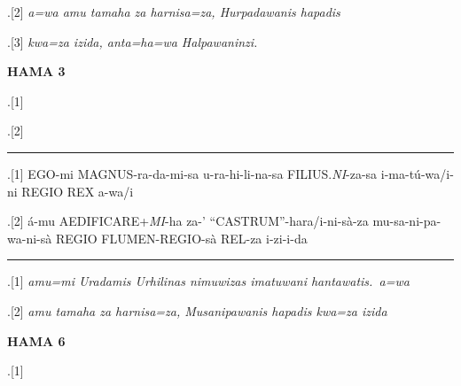 \begin{flushleft}
\ex.[2] \emph{a=wa amu tamaha za harnisa=za, Hurpadawanis hapadis}

\ex.[3] \emph{kwa=za izida, anta=ha=wa Halpawaninzi.}


\noindent \textbf{HAMA 3}

\ex.[1] \large {}\hspace{5pt}
\hspace{5pt}
\hspace{5pt}
\hspace{5pt}
\hspace{5pt}
\hspace{5pt}
\hspace{5pt}

\ex.[2] \large 
{}\hspace{5pt}
\hspace{5pt}
\hspace{5pt}
\hspace{5pt}
\hspace{5pt}
\hspace{5pt}
\hspace{5pt}


\hrule

	\ex.[1]  {EGO-mi}
{MAGNUS-ra-da-mi-sa}
{u-ra-hi-li-na-sa}
{FILIUS.\emph{NI}-za-sa}
{i-ma-tú-wa/i-ni}
{REGIO}
{REX}
{a-wa/i}

\ex.[2]   {á-mu} {AEDIFICARE+\emph{MI}-ha} {za-'} {``CASTRUM''-hara/i-ni-sà-za}
{mu-sa-ni-pa-wa-ni-sà REGIO}
{FLUMEN-REGIO-sà}
{REL-za i-zi-i-da}


\hrule

\ex.[1] \emph{amu=mi Uradamis Urhilinas nimuwizas imatuwani hantawatis.\ a=wa}

\ex.[2] \emph{amu tamaha za harnisa=za, Musanipawanis hapadis kwa=za izida}

\sloppybottom
\clearpage

\noindent \textbf{HAMA 6}

	\ex.[1] \large {}\hspace{5pt}
\hspace{5pt}
\hspace{5pt}
\hspace{5pt}
\hspace{5pt}
\hspace{5pt}
\hspace{5pt}


\end{flushleft}
